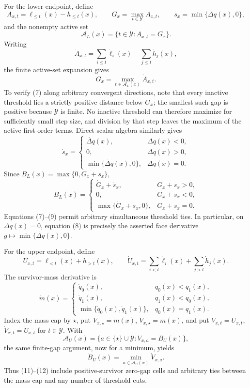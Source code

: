 For the lower endpoint, define
\[
A_{x,t}=\ell_{\le t}(x)-h_{\le t}(x),\qquad
G_x=\max_{t\in\mathcal Y}A_{x,t},\qquad
s_x=\min\{\Delta q(x),0\},
\tag{6}
\]
and the nonempty active set
\[
\mathcal A_L(x)=\{t\in\mathcal Y:A_{x,t}=G_x\}.
\]
Writing
\[
\dot A_{x,t}=\sum_{i\le t}\dot\ell_i(x)
-\sum_{j\le t}\dot h_j(x),
\]
the finite active-set expansion gives
\[
\dot G_x=\max_{t\in\mathcal A_L(x)}\dot A_{x,t}.
\tag{7}
\]
To verify (7) along arbitrary convergent directions, note that every
inactive threshold lies a strictly positive distance below \(G_x\); the
smallest such gap is positive because \(\mathcal Y\) is finite.  No
inactive threshold can therefore maximize for sufficiently small step
size, and division by that step leaves the maximum of the active
first-order terms.  Direct scalar algebra similarly gives
\[
\dot s_x=
\begin{cases}
\dot{\Delta q}(x),&\Delta q(x)<0,\\
0,&\Delta q(x)>0,\\
\min\{\dot{\Delta q}(x),0\},&\Delta q(x)=0.
\end{cases}
\tag{8}
\]
Since \(B_L(x)=\max\{0,G_x+s_x\}\),
\[
\dot B_L(x)=
\begin{cases}
\dot G_x+\dot s_x,&G_x+s_x>0,\\
0,&G_x+s_x<0,\\
\max\{\dot G_x+\dot s_x,0\},&G_x+s_x=0.
\end{cases}
\tag{9}
\]
Equations (7)--(9) permit arbitrary simultaneous threshold ties.  In
particular, on \(\Delta q(x)=0\), equation (8) is precisely the asserted
face derivative \(g\mapsto\min\{\dot{\Delta q}(x),0\}\).

For the upper endpoint, define
\[
U_{x,t}=\ell_{<t}(x)+h_{>t}(x),
\qquad
\dot U_{x,t}=\sum_{i<t}\dot\ell_i(x)+\sum_{j>t}\dot h_j(x).
\tag{10}
\]
The survivor-mass derivative is
\[
\dot m(x)=
\begin{cases}
\dot q_0(x),&q_0(x)<q_1(x),\\
\dot q_1(x),&q_1(x)<q_0(x),\\
\min\{\dot q_0(x),\dot q_1(x)\},&q_0(x)=q_1(x).
\end{cases}
\tag{11}
\]
Index the mass cap by \(\star\), put
\(V_{x,\star}=m(x)\), \(\dot V_{x,\star}=\dot m(x)\), and put
\(V_{x,t}=U_{x,t}\), \(\dot V_{x,t}=\dot U_{x,t}\) for
\(t\in\mathcal Y\).  With
\[
\mathcal A_U(x)=
\{a\in\{\star\}\cup\mathcal Y:V_{x,a}=B_U(x)\},
\]
the same finite-gap argument, now for a minimum, yields
\[
\dot B_U(x)=\min_{a\in\mathcal A_U(x)}\dot V_{x,a}.
\tag{12}
\]
Thus (11)--(12) include positive-survivor zero-gap cells and arbitrary
ties between the mass cap and any number of threshold cuts.

